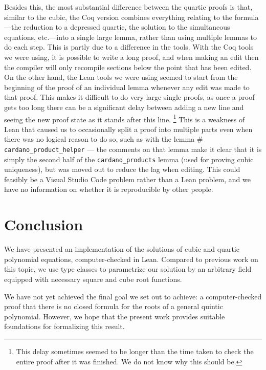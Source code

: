 \documentclass{article} %
\makeatletter
\newcommand{\linkprefix}{id:}
\newcommand{\coqdocbaseurl}{https://NicholasDyson.github.io/non-mathlib/}
\newcommand{\urlhash}{\#}
\newcommand{\coqdocurl}[2]{\coqdocbaseurl #1.html\urlhash #2}
\newcommand{\nolinkcoqident}[1]{\nolinkurl{#1}} %
\newcommand{\coqident}{\begingroup\@makeother\#\@coqident}
\newcommand{\@coqident}[3][]{%
  \ifthenelse{\isempty{#2}}%
  {\nolinkcoqident{#3}}%
  {\ifthenelse{\isempty{#1}}%
  {\href{\coqdocurl{#2}{#3}}{\color{blue}{\nolinkcoqident{\linkprefix #3}}}}%
  {\href{\coqdocurl{#2}{#3}}{\nolinkcoqident{#1}}}}%
\endgroup}
\theoremstyle{plain}
\theoremstyle{definition}
\newcommand{\Lean}{\textsf{Lean}\xspace}
\makeatother
\begin{document}
Besides this, the most substantial difference between the quartic proofs is that, similar to the cubic,
the Coq version combines everything relating to the formula---the reduction to a depressed quartic, the solution to the simultaneous equations, etc.---into a single large lemma, rather than using multiple lemmas to do each step.
This is partly due to a difference in the tools.
With the Coq tools we were using, it is possible to write a long proof,
and when making an edit then the compiler will only recompile sections below the point that has been edited.
On the other hand, the \Lean tools we were using seemed to start from the beginning of the proof of an individual lemma whenever any edit was made to that proof.
This makes it difficult to do very large single proofs,
as once a proof gets too long there can be a significant delay between adding a new line and seeing the new proof state as it stands after this line.%
\footnote{This delay sometimes seemed to be longer than the time taken to check the entire proof after it was finished. We do not know why this should be.}
This is a weakness of \Lean that caused us to occasionally split a proof into multiple parts even when there was no logical reason to do so,
such as with the lemma \coqident{cubic}{cardano_product_helper}---%
the comments on that lemma make it clear that it is simply the second half of the \lstinline{cardano_products} lemma (used for proving cubic uniqueness),
but was moved out to reduce the lag when editing.
This could feasibly be a Visual Studio Code problem rather than a \Lean problem,
and we have no information on whether it is reproducible by other people.

\section{Conclusion}
\label{sec:concl}

We have presented an implementation of the solutions of cubic and quartic polynomial equations, computer-checked in \Lean.
Compared to previous work on this topic, we use type classes to parametrize our solution by an arbitrary field equipped with necessary square and cube root functions.

We have not yet achieved the final goal we set out to achieve: a computer-checked proof that there is no closed formula for the roots of a general quintic polynomial.
However, we hope that the present work provides suitable foundations for formalizing this result.


%



%
\end{document}
